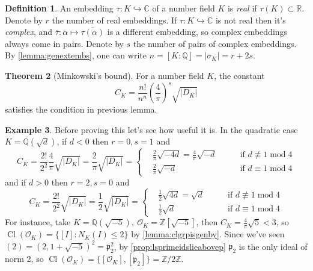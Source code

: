 \documentclass{article}
\newcommand{\Z}{\mathbb{Z}}
\newcommand{\Q}{\mathbb{Q}}
\newcommand{\R}{\mathbb{R}}
\newcommand{\C}{\mathbb{C}}
\newcommand{\Mod}{\operatorname{mod}}
\newcommand{\Cl}{\operatorname{Cl}}
\newcommand{\ri}{\mathcal{O}}
\newcommand{\ip}{\mathfrak{p}}
\theoremstyle{definition}
\newtheorem{defn}{Definition}[subsection]
\newtheorem{thm}[defn]{Theorem}
\newtheorem{example}[defn]{Example}
\begin{document}
\begin{defn}
An embedding $\tau:K\hookrightarrow\C$ of a number field $K$ is \textit{real} if $\tau(K)\subset\R$. Denote by $r$ the number of real embeddings. If $\tau:K\hookrightarrow\C$ is not real then it's \textit{complex}, and $\overline\tau:\alpha\mapsto\overline{\tau(\alpha)}$ is a different embedding, so complex embeddings always come in pairs. Denote by $s$ the number of pairs of complex embeddings. By \ref{lemma:genextembs}, one can write $n=[K:\Q]=\left|\sigma_K\right|=r+2s$.
\end{defn}

\begin{thm}[Minkowski's bound]
\label{thm:Minkowskibound}
For a number field $K$, the constant
\[
C_K=\frac{n!}{n^n}\left(\frac{4}{\pi}\right)^s\sqrt{|D_K|}
\]
satisfies the condition in previous lemma.
\end{thm}

\begin{example}
\label{example:Minkowskibound}
Before proving this let's see how useful it is. In the quadratic case $K=\Q\left(\sqrt d\right)$, if $d<0$ then $r=0,s=1$ and
\[
C_K=\frac{2!}{2^2}\frac{4}{\pi}\sqrt{|D_K|}=\frac{2}{\pi}\sqrt{|D_K|}=\left\{
\begin{aligned}
&\frac{2}{\pi}\sqrt{-4d}=\frac{4}{\pi}\sqrt{-d}\qquad &\text{if }d\nequiv 1\Mod 4 \\
&\frac{2}{\pi}\sqrt{-d}\qquad &\text{if }d\equiv 1\Mod 4
\end{aligned}
\right.
\]
and if $d>0$ then $r=2,s=0$ and
\[
C_K=\frac{2!}{2^2}\sqrt{|D_K|}=\frac{1}{2}\sqrt{|D_K|}=\left\{
\begin{aligned}
&\frac{1}{2}\sqrt{4d}=\sqrt{d}\qquad &\text{if }d\nequiv 1\Mod 4 \\
&\frac{1}{2}\sqrt{d}\qquad &\text{if }d\equiv 1\Mod 4
\end{aligned}
\right.
\]
For instance, take $K=\Q\left(\sqrt{-5}\right),\ \ri_K=\Z\left[\sqrt{-5}\right]$, then $C_K=\frac{4}{\pi}\sqrt{5}<3$, so $\Cl(\ri_K)=\{[I]:N_K(I)\leq 2\}$ by \ref{lemma:clgrpisgenby}. Since we've seen $(2)=\left(2,1+\sqrt{-5}\right)^2=\ip_2^2$, by \ref{prop:lsprimeidslieabovep} $\ip_2$ is the only ideal of norm 2, so $\Cl(\ri_K)=\{[\ri_K],[\ip_2]\}=\Z/2\Z$.
\end{example}
\end{document}
